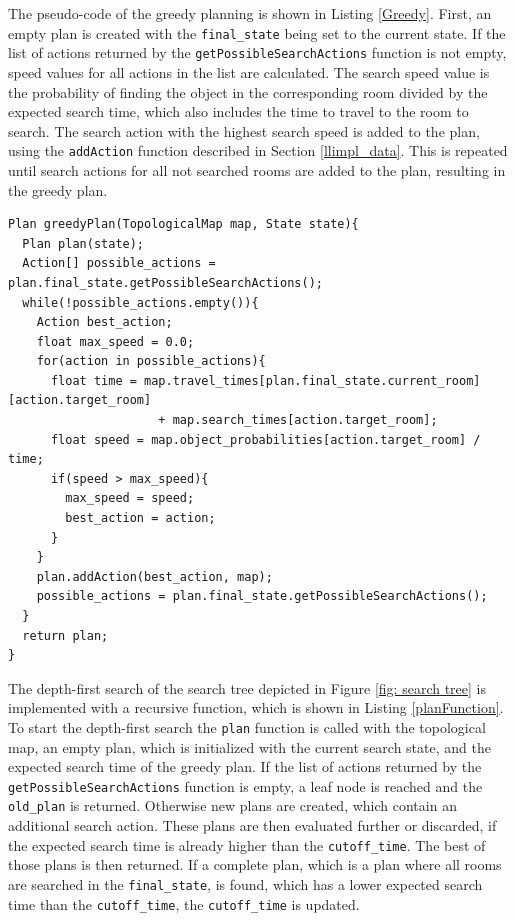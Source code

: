 The pseudo-code of the greedy planning is shown in Listing \ref{Greedy}. First, an empty plan is created with the \texttt{final{\_}state} being set to the current state. If the list of actions returned by the \texttt{getPossibleSearchActions} function is not empty, speed values for all actions in the list are calculated. The search speed value is the probability of finding the object in the corresponding room divided by the expected search time, which also includes the time to travel to the room to search. The search action with the highest search speed is added to the plan, using the \texttt{addAction} function described in Section \ref{llimpl_data}. This is repeated until search actions for all not searched rooms are added to the plan, resulting in the greedy plan.

\begin{minipage}{\linewidth}
\begin{lstlisting}[caption=Greedy planning,frame=single, label=Greedy]
Plan greedyPlan(TopologicalMap map, State state){
  Plan plan(state);
  Action[] possible_actions = plan.final_state.getPossibleSearchActions();
  while(!possible_actions.empty()){
    Action best_action;
    float max_speed = 0.0;
    for(action in possible_actions){
      float time = map.travel_times[plan.final_state.current_room][action.target_room] 
                     + map.search_times[action.target_room];
      float speed = map.object_probabilities[action.target_room] / time;
      if(speed > max_speed){
        max_speed = speed;
        best_action = action;
      }
    }
    plan.addAction(best_action, map);
    possible_actions = plan.final_state.getPossibleSearchActions();
  }
  return plan;
}
\end{lstlisting}
\end{minipage}

The depth-first search of the search tree depicted in Figure \ref{fig: search tree} is implemented with a recursive function, which is shown in Listing \ref{planFunction}. To start the depth-first search the \texttt{plan} function is called with the topological map, an empty plan, which is initialized with the current search state, and the expected search time of the greedy plan. If the list of actions returned by the \texttt{getPossibleSearchActions} function is empty, a leaf node is reached and the \texttt{old{\_}plan} is returned. Otherwise new plans are created, which contain an additional search action. These plans are then evaluated further or discarded, if the expected search time is already higher than the \texttt{cutoff{\_}time}. The best of those plans is then returned. If a complete plan, which is a plan where all rooms are searched in the \texttt{final{\_}state}, is found, which has a lower expected search time than the \texttt{cutoff{\_}time}, the \texttt{cutoff{\_}time} is updated.

